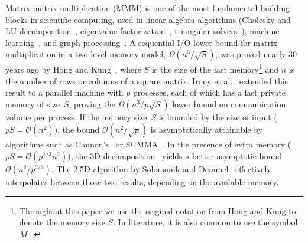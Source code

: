 \documentclass[sigplan,review,anonymous,10pt]{acmart}\settopmatter{printfolios=true,printccs=false,printacmref=false}
\newcommand\mac[1]{\textcolor{red}{[Mac: #1]}}
\begin{document}
Matrix-matrix multiplication (MMM) is one of the most fundamental building
blocks in scientific computing, used in linear algebra algorithms (Cholesky and
LU decomposition~\cite{meyer2000matrix}, eigenvalue
factorization~\cite{chatelin2012eigenvalues}, triangular
solvers~\cite{linearAlgebraLAPACK}), machine
learning~\cite{abadi2016tensorflow}, and graph
processing~\cite{cormen2009introduction, azad2015parallel,
kepner2016mathematical, ng2002spectral}.
%
A sequential I/O lower bound for matrix multiplication in a two-level memory
model, $\Omega\left({n^3}/{\sqrt{S}}\right)$, was proved nearly 30 years ago by
Hong and Kung~\cite{redblue}, where $S$ is the size of the fast
memory\footnote{Throughout this paper we use the original notation from Hong
and Kung to denote the memory size $S$. In literature, it is also common to use
the symbol $M$~\cite{externalMem,IronyMMM, parallelExMem}.} and $n$ is the
number of rows or columns of a square matrix.
%
%
Irony et al.~\cite{IronyMMM} extended this
result to a parallel machine with $p$ processes,
each of which has a fast private memory of size~$S$, proving the
$\Omega\left({n^3}/{p\sqrt{S}}\right)$ lower bound on communication volume per 
process.
%
%
If the memory size~$S$ is bounded by the size of
input ($pS = \mathcal{O}(n^2)$), the bound
$\mathcal{O}\left({n^2}/{\sqrt{p}}\right)$  is asymptotically attainable by
algorithms such as Cannon's~\cite{Cannon} or SUMMA~\cite{summa}. In the
presence of extra memory ($pS = \mathcal{O}(p^{1/3} n^2)$), the 3D
decomposition~\cite{summa3d} yields a better asymptotic bound
$\mathcal{O}\left({n^2}/{p^{2/3}}\right)$. The 2.5D algorithm by Solomonik
and Demmel~\cite{25d} effectively interpolates
between those two results, depending on the available
memory.
\end{document}
